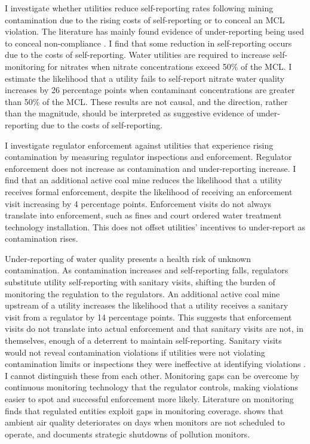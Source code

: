 \documentclass[12pt]{article}
\begin{document}
I investigate whether utilities reduce self-reporting rates following mining contamination due to the rising costs of self-reporting or to conceal an MCL violation. The literature has mainly found evidence of under-reporting being used to conceal non-compliance \parencite{wallsten2008effects, foster2019arsenic, zou2021unwatched, 10.1162/rest_a_01477}. I find that some reduction in self-reporting occurs due to the costs of self-reporting. Water utilities are required to increase self-monitoring for nitrates when nitrate concentrations exceed 50\% of the MCL. I estimate the likelihood that a utility fails to self-report nitrate water quality increases by 26 percentage points when contaminant concentrations are greater than 50\% of the MCL. These results are not causal, and the direction, rather than the magnitude, should be interpreted as suggestive evidence of under-reporting due to the costs of self-reporting.

I investigate regulator enforcement against utilities that experience rising contamination by measuring regulator inspections and enforcement. Regulator enforcement does not increase as contamination and under-reporting increase. I find that an additional active coal mine reduces the likelihood that a utility receives formal enforcement, despite the likelihood of receiving an enforcement visit increasing by 4 percentage points. Enforcement visits do not always translate into enforcement, such as fines and court ordered water treatment technology installation. This does not offset utilities' incentives to under-report as contamination rises. 

Under-reporting of water quality presents a health risk of unknown contamination. As contamination increases and self-reporting falls, regulators substitute utility self-reporting with sanitary visits, shifting the burden of monitoring the regulation to the regulators. An additional active coal mine upstream of a utility increases the likelihood that a utility receives a sanitary visit from a regulator by 14 percentage points. This suggests that enforcement visits do not translate into actual enforcement and that sanitary visits are not, in themselves, enough of a deterrent to maintain self-reporting. Sanitary visits would not reveal contamination violations if utilities were not violating contamination limits or inspections they were ineffective at identifying violations \parencite{mi2026technology}. I cannot distinguish these from each other. Monitoring gaps can be overcome by continuous monitoring technology that the regulator controls, making violations easier to spot and successful enforcement more likely. Literature on monitoring finds that regulated entities exploit gaps in monitoring coverage. \textcite{zou2021unwatched} shows that ambient air quality deteriorates on days when monitors are not scheduled to operate, and \textcite{mu2024s} documents strategic shutdowns of pollution monitors.
\end{document}
